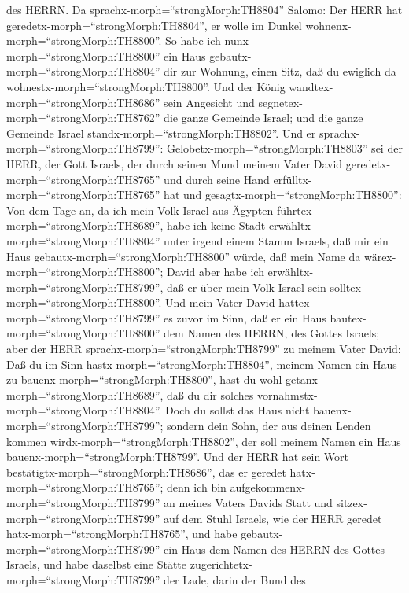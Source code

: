 des HERRN.  Da sprachx-morph=``strongMorph:TH8804'' Salomo:
Der HERR hat geredetx-morph=``strongMorph:TH8804'', er wolle im Dunkel
wohnenx-morph=``strongMorph:TH8800''.  So habe ich
nunx-morph=``strongMorph:TH8800'' ein Haus
gebautx-morph=``strongMorph:TH8804'' dir zur Wohnung, einen Sitz, daß du
ewiglich da wohnestx-morph=``strongMorph:TH8800''.  Und der
König wandtex-morph=``strongMorph:TH8686'' sein Angesicht und
segnetex-morph=``strongMorph:TH8762'' die ganze Gemeinde Israel; und die
ganze Gemeinde Israel standx-morph=``strongMorph:TH8802''. 
Und er sprachx-morph=``strongMorph:TH8799'':
Gelobetx-morph=``strongMorph:TH8803'' sei der HERR, der Gott Israels,
der durch seinen Mund meinem Vater David
geredetx-morph=``strongMorph:TH8765'' und durch seine Hand
erfülltx-morph=``strongMorph:TH8765'' hat und
gesagtx-morph=``strongMorph:TH8800'':  Von dem Tage an, da
ich mein Volk Israel aus Ägypten führtex-morph=``strongMorph:TH8689'',
habe ich keine Stadt erwähltx-morph=``strongMorph:TH8804'' unter irgend
einem Stamm Israels, daß mir ein Haus
gebautx-morph=``strongMorph:TH8800'' würde, daß mein Name da
wärex-morph=``strongMorph:TH8800''; David aber habe ich
erwähltx-morph=``strongMorph:TH8799'', daß er über mein Volk Israel sein
solltex-morph=``strongMorph:TH8800''.  Und mein Vater David
hattex-morph=``strongMorph:TH8799'' es zuvor im Sinn, daß er ein Haus
bautex-morph=``strongMorph:TH8800'' dem Namen des HERRN, des Gottes
Israels;  aber der HERR
sprachx-morph=``strongMorph:TH8799'' zu meinem Vater David: Daß du im
Sinn hastx-morph=``strongMorph:TH8804'', meinem Namen ein Haus zu
bauenx-morph=``strongMorph:TH8800'', hast du wohl
getanx-morph=``strongMorph:TH8689'', daß du dir solches
vornahmstx-morph=``strongMorph:TH8804''.  Doch du sollst
das Haus nicht bauenx-morph=``strongMorph:TH8799''; sondern dein Sohn,
der aus deinen Lenden kommen wirdx-morph=``strongMorph:TH8802'', der
soll meinem Namen ein Haus bauenx-morph=``strongMorph:TH8799''.
 Und der HERR hat sein Wort
bestätigtx-morph=``strongMorph:TH8686'', das er geredet
hatx-morph=``strongMorph:TH8765''; denn ich bin
aufgekommenx-morph=``strongMorph:TH8799'' an meines Vaters Davids Statt
und sitzex-morph=``strongMorph:TH8799'' auf dem Stuhl Israels, wie der
HERR geredet hatx-morph=``strongMorph:TH8765'', und habe
gebautx-morph=``strongMorph:TH8799'' ein Haus dem Namen des HERRN des
Gottes Israels,  und habe daselbst eine Stätte
zugerichtetx-morph=``strongMorph:TH8799'' der Lade, darin der Bund des
